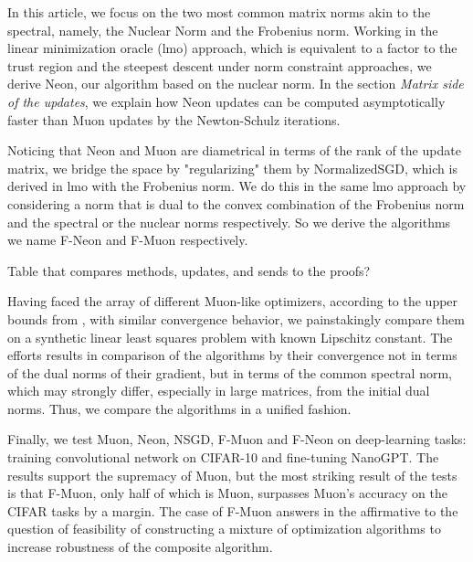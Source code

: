\documentclass{article} %
\begin{document}
 In this article, we focus on the two most common matrix norms akin to the spectral, namely, the Nuclear Norm and the Frobenius norm. Working in the linear minimization oracle (lmo) approach, which is equivalent to a factor to the trust region and the steepest descent under norm constraint approaches, we derive Neon, our algorithm based on the nuclear norm. In the section {\it Matrix side of the updates}, we explain how Neon updates can be computed asymptotically faster than Muon updates by the Newton-Schulz iterations.

 Noticing that Neon and Muon are diametrical in terms of the rank of the update matrix, we bridge the space by "regularizing" them by NormalizedSGD, which is derived in lmo with the Frobenius norm. We do this in the same lmo approach by considering a norm that is dual to the convex combination of the Frobenius norm and the spectral or the nuclear norms respectively. So we derive the algorithms we name F-Neon and F-Muon respectively.

 Table that compares methods, updates, and sends to the proofs?

 Having faced the array of different Muon-like optimizers, according to the upper bounds from \cite{kovalev2025understanding,riabinin2025gluon}, with similar convergence behavior, we painstakingly compare them on a synthetic linear least squares problem with known Lipschitz constant. The efforts results in comparison of the algorithms by their convergence not in terms of the dual norms of their gradient, but in terms of the common spectral norm, which may strongly differ, especially in large matrices, from the initial dual norms. Thus, we compare the algorithms in a unified fashion.

 Finally, we test Muon, Neon, NSGD, F-Muon and F-Neon on deep-learning tasks: training convolutional network on CIFAR-10 and fine-tuning NanoGPT. The results support the supremacy of Muon, but the most striking result of the tests is that F-Muon, only half of which is Muon, surpasses Muon's accuracy on the CIFAR tasks by a margin. The case of F-Muon answers in the affirmative to the question of feasibility of constructing a mixture of optimization algorithms to increase robustness of the composite algorithm.
\end{document}

